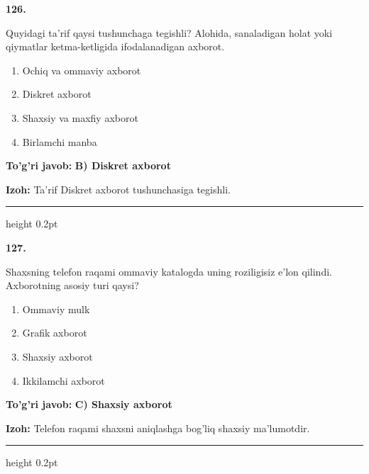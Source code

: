 \documentclass[10pt,a4paper,oneside]{article}
\begin{document}
\noindent\textbf{\color{ink}126.}
\par
Quyidagi ta'rif qaysi tushunchaga tegishli? Alohida, sanaladigan holat yoki qiymatlar ketma-ketligida ifodalanadigan axborot.
\begin{enumerate}[label=\Alph*),leftmargin=9mm]
\item Ochiq va ommaviy axborot
\item Diskret axborot
\item Shaxsiy va maxfiy axborot
\item Birlamchi manba
\end{enumerate}
\begin{tcolorbox}[enhanced,breakable,colback=teal!4,colframe=teal!50!black,boxrule=0.5pt,arc=1.1mm,left=3mm,right=3mm,top=1.7mm,bottom=1.7mm,before skip=2mm,after skip=2mm]
\textbf{\color{teal}To'g'ri javob:} \textbf{B) Diskret axborot}
\par\smallskip
\textbf{Izoh:} Ta'rif Diskret axborot tushunchasiga tegishli.
\end{tcolorbox}
\vspace{2mm}\hrule height 0.2pt \vspace{3mm}

\noindent\textbf{\color{ink}127.}
\par
Shaxsning telefon raqami ommaviy katalogda uning roziligisiz e'lon qilindi. Axborotning asosiy turi qaysi?
\begin{enumerate}[label=\Alph*),leftmargin=9mm]
\item Ommaviy mulk
\item Grafik axborot
\item Shaxsiy axborot
\item Ikkilamchi axborot
\end{enumerate}
\begin{tcolorbox}[enhanced,breakable,colback=teal!4,colframe=teal!50!black,boxrule=0.5pt,arc=1.1mm,left=3mm,right=3mm,top=1.7mm,bottom=1.7mm,before skip=2mm,after skip=2mm]
\textbf{\color{teal}To'g'ri javob:} \textbf{C) Shaxsiy axborot}
\par\smallskip
\textbf{Izoh:} Telefon raqami shaxsni aniqlashga bog'liq shaxsiy ma'lumotdir.
\end{tcolorbox}
\vspace{2mm}\hrule height 0.2pt \vspace{3mm}
\end{document}
